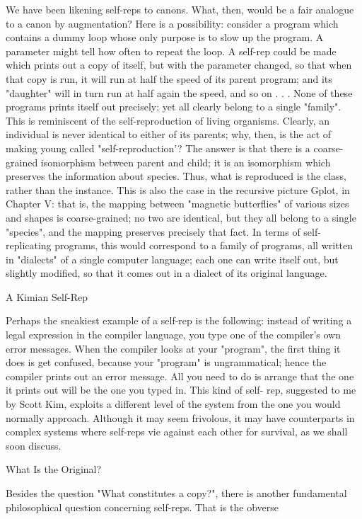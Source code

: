 {We have been likening self-reps to canons. What, then, would be a fair analogue to a canon
by augmentation? Here is a possibility: consider a program which contains a dummy loop
whose only purpose is to slow up the program. A parameter might tell how often to repeat the
loop. A self-rep could be made which prints out a copy of itself, but with the parameter
changed, so that when that copy is run, it will run at half the speed of its parent program; and
its "daughter" will in turn run at half again the speed, and so on . . . None of these programs
prints itself out precisely; yet all clearly belong to a single "family".
         This is reminiscent of the self-reproduction of living organisms. Clearly, an
individual is never identical to either of its parents; why, then, is the act of making young
called "self-reproduction'? The answer is that there is a coarse-grained isomorphism between
parent and child; it is an isomorphism which preserves the information about species. Thus,
what is reproduced is the class, rather than the instance. This is also the case in the recursive
picture Gplot, in Chapter V: that is, the mapping between "magnetic butterflies" of various
sizes and shapes is coarse-grained; no two are identical, but they all belong to a single
"species", and the mapping preserves precisely that fact. In terms of self-replicating
programs, this would correspond to a family of programs, all written in "dialects" of a single
computer language; each one can write itself out, but slightly modified, so that it comes out
in a dialect of its original language.

                                     A Kimian Self-Rep

 Perhaps the sneakiest example of a self-rep is the following: instead of writing a legal
expression in the compiler language, you type one of the compiler's own error messages.
When the compiler looks at your "program", the first thing it does is get confused, because
your "program" is ungrammatical; hence the compiler prints out an error message. All you
need to do is arrange that the one it prints out will be the one you typed in. This kind of self-
rep, suggested to me by Scott Kim, exploits a different level of the system from the one you
would normally approach. Although it may seem frivolous, it may have counterparts in
complex systems where self-reps vie against each other for survival, as we shall soon discuss.

                                    What Is the Original?

Besides the question "What constitutes a copy?", there is another fundamental philosophical
question concerning self-reps. That is the obverse




}
